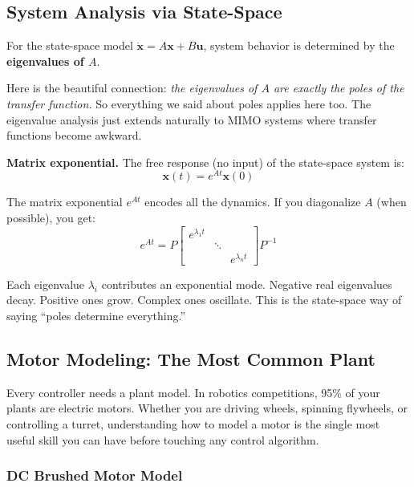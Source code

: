 \subsection{System Analysis via State-Space}

For the state-space model $\dot{\mathbf{x}} = A\mathbf{x} + B\mathbf{u}$, system behavior is determined by the \textbf{eigenvalues of $A$}.

Here is the beautiful connection: \textit{the eigenvalues of $A$ are exactly the poles of the transfer function.} So everything we said about poles applies here too. The eigenvalue analysis just extends naturally to MIMO systems where transfer functions become awkward.

\textbf{Matrix exponential.} The free response (no input) of the state-space system is:
\begin{equation}
\mathbf{x}(t) = e^{At}\mathbf{x}(0)
\end{equation}

The matrix exponential $e^{At}$ encodes all the dynamics. If you diagonalize $A$ (when possible), you get:
\begin{equation}
e^{At} = P \begin{bmatrix} e^{\lambda_1 t} & & \\ & \ddots & \\ & & e^{\lambda_n t} \end{bmatrix} P^{-1}
\end{equation}

Each eigenvalue $\lambda_i$ contributes an exponential mode. Negative real eigenvalues decay. Positive ones grow. Complex ones oscillate. This is the state-space way of saying ``poles determine everything.''

\subsection{Motor Modeling: The Most Common Plant}

Every controller needs a plant model. In robotics competitions, 95\% of your plants are electric motors. Whether you are driving wheels, spinning flywheels, or controlling a turret, understanding how to model a motor is the single most useful skill you can have before touching any control algorithm.

\subsubsection*{DC Brushed Motor Model}

